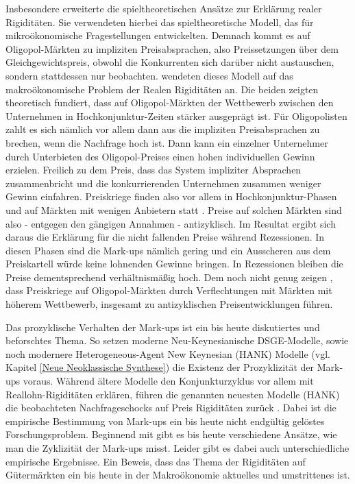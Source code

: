 Insbesondere \textcite{Rotemberg1986} erweiterte die spieltheoretischen Ansätze zur Erklärung realer Rigiditäten. Sie verwendeten hierbei das spieltheoretische Modell, das \textcite{Friedman1971} für mikroökonomische Fragestellungen entwickelten. Demnach kommt es auf Oligopol-Märkten zu impliziten Preisabsprachen, also Preissetzungen über dem Gleichgewichtspreis, obwohl die Konkurrenten sich darüber nicht austauschen, sondern stattdessen nur beobachten. \textcite{Rotemberg1986} wendeten dieses Modell auf das makroökonomische Problem der Realen Rigiditäten an. Die beiden zeigten theoretisch fundiert, dass auf Oligopol-Märkten der Wettbewerb zwischen den Unternehmen in Hochkonjunktur-Zeiten stärker ausgeprägt ist. Für Oligopolisten zahlt es sich nämlich vor allem dann aus die impliziten Preisabsprachen zu brechen, wenn die Nachfrage hoch ist. Dann kann ein einzelner Unternehmer durch Unterbieten des Oligopol-Preises einen hohen individuellen Gewinn erzielen. Freilich zu dem Preis, dass das System impliziter Absprachen zusammenbricht und die konkurrierenden Unternehmen zusammen weniger Gewinn einfahren. Preiskriege finden also vor allem in Hochkonjunktur-Phasen und auf Märkten mit wenigen Anbietern statt \parencite[S. 391]{Rotemberg1986}. Preise auf solchen Märkten sind also - entgegen den gängigen Annahmen - antizyklisch. Im Resultat ergibt sich daraus die Erklärung für die nicht fallenden Preise während Rezessionen. In diesen Phasen sind die Mark-ups nämlich gering und ein Ausscheren aus dem Preiskartell würde keine lohnenden Gewinne bringen. In Rezessionen bleiben die Preise dementsprechend verhältnismäßig hoch. Dem noch nicht genug zeigen \textcite{Rotemberg1986}, dass Preiskriege auf Oligopol-Märkten durch Verflechtungen mit Märkten mit höherem Wettbewerb, insgesamt zu antizyklischen Preisentwicklungen führen.

Das prozyklische Verhalten der Mark-ups ist ein bis heute diskutiertes und beforschtes Thema. So setzen moderne Neu-Keynesianische DSGE-Modelle, sowie noch modernere Heterogeneous-Agent New Keynesian (HANK) Modelle (vgl. Kapitel \ref{Neue Neoklassische Synthese}) die Existenz der Prozyklizität der Mark-ups voraus. Während ältere Modelle den Konjunkturzyklus vor allem mit Reallohn-Rigiditäten erklären, führen die genannten neuesten Modelle (HANK) die beobachteten Nachfrageschocks auf Preis Rigiditäten zurück \parencite[S. 3]{Nekarda2020}. Dabei ist die empirische Bestimmung von Mark-ups ein bis heute nicht endgültig gelöstes Forschungsproblem. Beginnend mit \textcite{Bils1987} gibt es bis heute \parencite[S. 4f]{Nekarda2020} verschiedene Ansätze, wie man die Zyklizität der Mark-ups misst. Leider gibt es dabei auch unterschiedliche empirische Ergebnisse. Ein Beweis, dass das Thema der Rigiditäten auf Gütermärkten ein bis heute in der Makroökonomie aktuelles und umstrittenes ist. 


